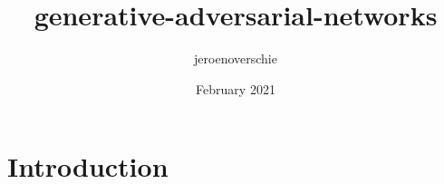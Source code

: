 \documentclass{article}
\title{generative-adversarial-networks}
\author{jeroenoverschie }
\date{February 2021}
\begin{document}
\maketitle

\section{Introduction}
\end{document}

